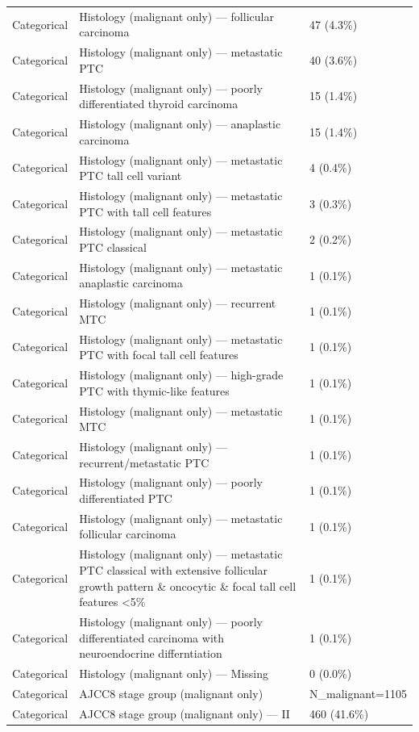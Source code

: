 \begin{table}[htbp]
\begin{tabular}{lll}
Categorical & Histology (malignant only) — follicular carcinoma & 47 (4.3\%) \\
Categorical & Histology (malignant only) — metastatic PTC & 40 (3.6\%) \\
Categorical & Histology (malignant only) — poorly differentiated thyroid carcinoma & 15 (1.4\%) \\
Categorical & Histology (malignant only) — anaplastic carcinoma & 15 (1.4\%) \\
Categorical & Histology (malignant only) — metastatic PTC tall cell variant & 4 (0.4\%) \\
Categorical & Histology (malignant only) — metastatic PTC with tall cell features & 3 (0.3\%) \\
Categorical & Histology (malignant only) — metastatic PTC classical & 2 (0.2\%) \\
Categorical & Histology (malignant only) — metastatic anaplastic carcinoma & 1 (0.1\%) \\
Categorical & Histology (malignant only) — recurrent MTC & 1 (0.1\%) \\
Categorical & Histology (malignant only) — metastatic PTC with focal tall cell features & 1 (0.1\%) \\
Categorical & Histology (malignant only) — high-grade PTC with thymic-like features & 1 (0.1\%) \\
Categorical & Histology (malignant only) — metastatic MTC & 1 (0.1\%) \\
Categorical & Histology (malignant only) — recurrent/metastatic PTC & 1 (0.1\%) \\
Categorical & Histology (malignant only) — poorly differentiated PTC & 1 (0.1\%) \\
Categorical & Histology (malignant only) — metastatic follicular carcinoma & 1 (0.1\%) \\
Categorical & Histology (malignant only) — metastatic PTC classical with extensive follicular growth pattern \& oncocytic \& focal tall cell features <5\% & 1 (0.1\%) \\
Categorical & Histology (malignant only) — poorly differentiated carcinoma with neuroendocrine differntiation & 1 (0.1\%) \\
Categorical & Histology (malignant only) — Missing & 0 (0.0\%) \\
Categorical & AJCC8 stage group (malignant only) & N\_malignant=1105 \\
Categorical & AJCC8 stage group (malignant only) — II & 460 (41.6\%) \\

\end{tabular}
\end{table}
